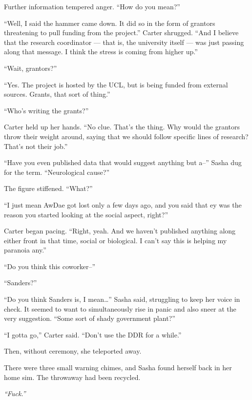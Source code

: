 Further information tempered anger. ``How do you mean?''

``Well, I said the hammer came down. It did so in the form of grantors threatening to pull funding from the project.'' Carter shrugged. ``And I believe that the research coordinator — that is, the university itself — was just passing along that message. I think the stress is coming from higher up.''

``Wait, grantors?''

``Yes. The project is hosted by the UCL, but is being funded from external sources. Grants, that sort of thing.''

``Who's writing the grants?''

Carter held up her hands. ``No clue. That's the thing. Why would the grantors throw their weight around, saying that we should follow specific lines of research? That's not their job.''

``Have you even published data that would suggest anything but a--'' Sasha dug for the term. ``Neurological cause?''

The figure stiffened. ``What?''

``I just mean AwDae got lost only a few days ago, and you said that ey was the reason you started looking at the social aspect, right?''

Carter began pacing. ``Right, yeah. And we haven't published anything along either front in that time, social or biological. I can't say this is helping my paranoia any.''

``Do you think this coworker--''

``Sanders?''

``Do you think Sanders is, I mean\ldots{}'' Sasha said, struggling to keep her voice in check. It seemed to want to simultaneously rise in panic and also sneer at the very suggestion. ``Some sort of shady government plant?''

``I gotta go,'' Carter said. ``Don't use the DDR for a while.''

Then, without ceremony, she teleported away.

There were three small warning chimes, and Sasha found herself back in her home sim. The throwaway had been recycled.

\emph{``Fuck.''}
